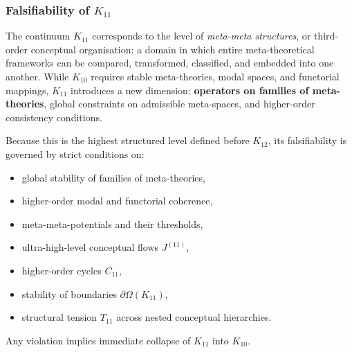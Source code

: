
\subsubsection{Falsifiability of $K_{11}$}
\label{sec:falsifiability-k11}

The continuum $K_{11}$ corresponds to the level of \emph{meta-meta
structures}, or third-order conceptual organisation: a domain in which
entire meta-theoretical frameworks can be compared, transformed,
classified, and embedded into one another. While $K_{10}$ requires stable
meta-theories, modal spaces, and functorial mappings, $K_{11}$ introduces
a new dimension: \textbf{operators on families of meta-theories}, global
constraints on admissible meta-spaces, and higher-order consistency conditions.

Because this is the highest structured level defined before $K_{12}$,
its falsifiability is governed by strict conditions on:

\begin{itemize}
    \item global stability of families of meta-theories,
    \item higher-order modal and functorial coherence,
    \item meta-meta-potentials and their thresholds,
    \item ultra-high-level conceptual flows $J^{(11)}$,
    \item higher-order cycles $C_{11}$,
    \item stability of boundaries $\partial\Omega(K_{11})$,
    \item structural tension $T_{11}$ across nested conceptual hierarchies.
\end{itemize}

Any violation implies immediate collapse of $K_{11}$ into $K_{10}$.



